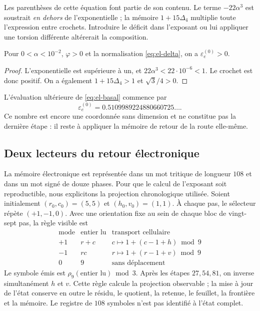 Les parenthèses de cette équation font partie de son contenu. Le terme \(-22\alpha^3\) est soustrait \emph{en dehors} de l'exponentielle ; la mémoire \(1+15\Delta_4\) multiplie toute l'expression entre crochets. Introduire le déficit dans l'exposant ou lui appliquer une torsion différente altérerait la composition.

\begin{proposition}
Pour \(0<\alpha<10^{-2}\), \(\varphi>0\) et la normalisation \eqref{eq:el-delta}, on a \(\varepsilon_e^{(0)}>0\).
\end{proposition}
\begin{proof}
L'exponentielle est supérieure à un, et
\(22\alpha^3<22\cdot10^{-6}<1\). Le crochet est donc positif.
On a également \(1+15\Delta_4>1\) et \(\sqrt3/4>0\).
\end{proof}

L'évaluation ultérieure de \eqref{eq:el-basal} commence par
\[
 \varepsilon_e^{(0)}=0.5109989224880660725\ldots.
\]
Ce nombre est encore une coordonnée sans dimension et ne constitue pas la dernière étape : il reste à appliquer la mémoire de retour de la route elle-même.

\subsection{Deux lecteurs du retour électronique}

La mémoire électronique est représentée dans un mot tritique de longueur \(108\) et dans un mot signé de douze phases. Pour que le calcul de l'exposant soit reproductible, nous explicitons la projection chronologique utilisée. Soient initialement \((r_0,c_0)=(5,5)\) et \((h_0,v_0)=(1,1)\). À chaque pas, le sélecteur répète \((+1,-1,0)\). Avec une orientation fixe au sein de chaque bloc de vingt-sept pas, la règle visible est
\[
 \begin{array}{c|c|c}
 \text{mode}&\text{entier lu}&\text{transport cellulaire}\\\hline
 +1&r+c&c\mapsto1+(c-1+h)\bmod9\\
 -1&rc&r\mapsto1+(r-1+v)\bmod9\\
 0&9&\text{sans déplacement}
 \end{array}
\]
Le symbole émis est \(\rho_9(\text{entier lu})\bmod3\).
Après les étapes \(27,54,81\), on inverse simultanément
\(h\) et \(v\). Cette règle calcule la projection observable ; la
mise à jour de l'état conserve en outre le résidu, le quotient,
la retenue, le feuillet, la frontière et la mémoire. Le registre de
\(108\) symboles n'est pas identifié à l'état complet.

